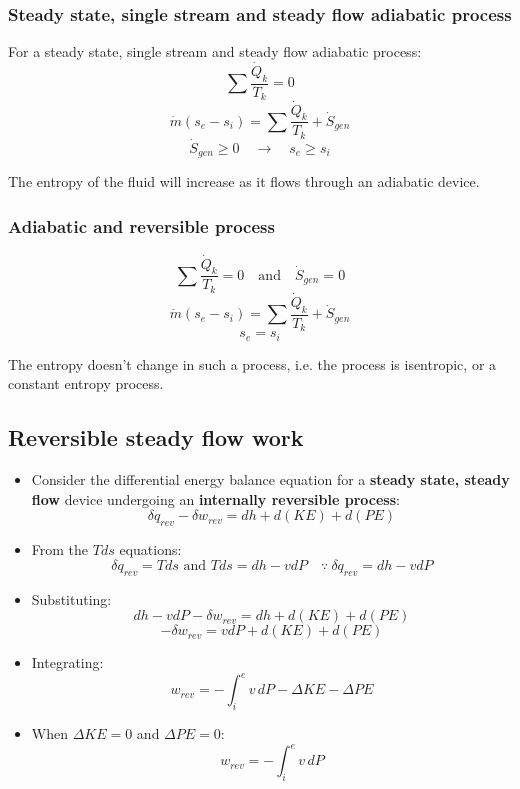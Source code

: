 \documentclass[11pt]{article}
\begin{document}
\subsubsection{Steady state, single stream and steady flow adiabatic process}
\label{sec:org2ae434f}
For a steady state, single stream and steady flow adiabatic process:
\[\sum \frac{\dot{Q}_k}{T_k} = 0\]
\[\dot{m} (s_e - s_i) = \sum \frac{\dot{Q}_k}{T_k} + \dot{S}_{gen}\]
\[\dot{S}_{gen} \ge 0 \quad \rightarrow \quad s_e \ge s_i\]

The entropy of the fluid will increase as it flows through an adiabatic device.
\subsubsection{Adiabatic and reversible process}
\label{sec:org1bf33c6}
\[\sum \frac{\dot{Q}_k}{T_k} = 0 \quad \text{and} \quad \dot{S}_{gen} = 0\]
\[\dot{m} (s_e - s_i) = \sum \frac{\dot{Q}_k}{T_k} + \dot{S}_{gen}\]
\[s_e = s_i\]

The entropy doesn't change in such a process, i.e. the process is isentropic, or a constant entropy process.

 \newpage
\subsection{Reversible steady flow work}
\label{sec:orgdb97413}
\begin{itemize}
\item Consider the differential energy balance equation for a \textbf{steady state, steady flow} device undergoing an \textbf{internally reversible process}:
\[\delta q_{rev} - \delta w_{rev} = dh + d(KE) + d(PE)\]
\item From the \(Tds\) equations:
\[\delta q_{rev} = T ds \text{ and } Tds = dh - v dP \quad \because \ \delta q_{rev} = dh - vdP\]
\item Substituting:
\[dh - vdP - \delta w_{rev} = dh + d(KE) + d(PE)\]
\[- \delta w_{rev} = v dP + d(KE) + d(PE)\]
\item Integrating:
\[w_{rev} = - \int_i^e v \, dP - \Delta KE - \Delta PE\]
\item When \(\Delta KE = 0\) and \(\Delta PE = 0\):
\[w_{rev} = - \int_i^e v \, dP\]
\end{itemize}
\end{document}
